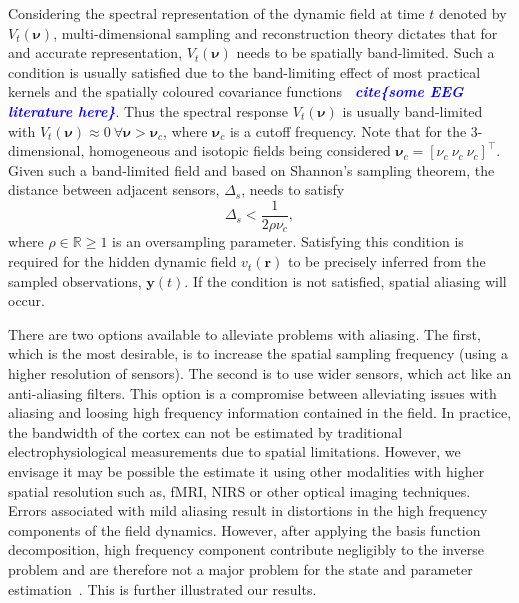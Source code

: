 \documentclass[12pt]{iopart}		%
\newcommand{\todo}[1]{\textsf{\emph{\textbf{\textcolor{blue}{#1}}}}}
\begin{document}
Considering the spectral representation of the dynamic field at time $t$ denoted by $V_t(\boldsymbol{\nu})$, multi-dimensional sampling and reconstruction theory dictates that for and accurate representation, $V_t(\boldsymbol{\nu})$ needs to be spatially band-limited. Such a condition is usually satisfied due to the band-limiting effect of most practical kernels and the spatially coloured covariance functions \todo{~cite\{some EEG literature here\}}. Thus the spectral response $V_t(\boldsymbol{\nu})$ is usually band-limited with $V_t(\boldsymbol{\nu}) \approx 0 ~ \forall \boldsymbol{\nu} > \boldsymbol{\nu}_c$, where $\boldsymbol{\nu}_c$ is a cutoff frequency. Note that for the 3-dimensional, homogeneous and isotopic fields being considered $\boldsymbol{\nu}_c = [\nu_c ~ \nu_c ~ \nu_c]^\top$. Given such a band-limited field and based on Shannon's sampling theorem, the distance between adjacent sensors, $\Delta_s$, needs to satisfy
\begin{equation}\label{eq:MinimumSensorDistance}
\Delta_s < \frac{1}{2\rho\nu_c},
\end{equation}
where $\rho \in \mathbb{R} \ge 1$ is an oversampling parameter. Satisfying this condition is required for the hidden dynamic field $v_t(\mathbf{r})$ to be precisely inferred from the sampled observations, $\mathbf{y}(t)$. If the condition is not satisfied, spatial aliasing will occur. 

There are two options available to alleviate problems with aliasing. The first, which is the most desirable, is to increase the spatial sampling frequency (using a higher resolution of sensors). The second is to use wider sensors, which act like an anti-aliasing filters. This option is a compromise between alleviating issues with aliasing and loosing high frequency information contained in the field. In practice, the bandwidth of the cortex can not be estimated by traditional electrophysiological measurements due to spatial limitations. However, we envisage it may be possible the estimate it using other modalities with higher spatial resolution such as, fMRI, NIRS or other optical imaging techniques. Errors associated with mild aliasing result in distortions in the high frequency components of the field dynamics. However, after applying the basis function decomposition, high frequency component contribute negligibly to the inverse problem and are therefore not a major problem for the state and parameter estimation~\cite{Sanner1992}. This is further illustrated our results.
\end{document}
